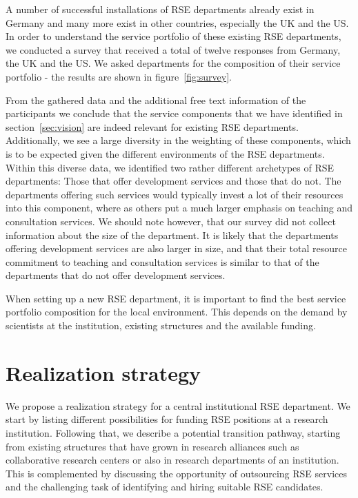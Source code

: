 \documentclass[a4paper]{article}
\begin{document}
A number of successful installations of RSE departments already exist in Germany and many more exist in other countries, especially the UK and the US.
In order to understand the service portfolio of these existing RSE departments, we conducted a survey that received a total of twelve responses from Germany, the UK and the US.
We asked departments for the composition of their service portfolio - the results are shown in figure~\ref{fig:survey}.

From the gathered data and the additional free text information of the participants we conclude that the service components that we have identified in section~\ref{sec:vision} are indeed relevant for existing RSE departments.
Additionally, we see a large diversity in the weighting of these components, which is to be expected given the different environments of the RSE departments.
Within this diverse data, we identified two rather different archetypes of RSE departments: Those that offer development services and those that do not.
The departments offering such services would typically invest a lot of their resources into this component, where as others put a much larger emphasis on teaching and consultation services.
We should note however, that our survey did not collect information about the size of the department.
It is likely that the departments offering development services are also larger in size,
and that their total resource commitment to teaching and consultation services is similar to that of the departments that do not offer development services.

When setting up a new RSE department, it is important to find the best service portfolio composition for the local environment.
This depends on the demand by scientists at the institution, existing structures and the available funding.

\section{Realization strategy}
\label{sec:realization}

We propose a realization strategy for a central institutional RSE department.
We start by listing different possibilities for funding RSE positions at a research institution.
Following that, we describe a potential transition pathway, starting from existing structures that have grown in research alliances such as collaborative research centers or also in research departments of an institution.
This is complemented by discussing the opportunity of outsourcing RSE services and the challenging task of identifying and hiring suitable RSE candidates.
\end{document}
